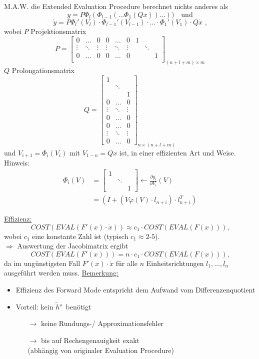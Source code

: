 \noindent M.A.W. die Extended Evaluation Procedure berechnet nichts anderes als
$$y=P \Phi_l(\Phi_{l-1}(\dots \Phi_1(Qx))\dots)) \quad \text{und}$$
$$\dot{y} = P \Phi_l'(V_l)\cdot\Phi_{l-1}'(V_{l-1})\cdot\dots\cdot\Phi_1'(V_1)\cdot Q\dot{x} \text{ ,}$$
wobei
$P$ Projektionsmatrix
$$ P =
\begin{bmatrix}
	  0		& \dots	& 0		& 0		& \dots	& 0		& 1	& 		&  \\
	  \vdots& \ddots& \vdots& \vdots& \ddots& \vdots& 	& \ddots&  \\
	  0		& \dots & 0		& 0		& \dots	& 0		&	&		& 1\\
\end{bmatrix}_{(n+l+m)\times m}
$$
$Q$ Prolongationsmatrix
$$ Q= 
\begin{bmatrix}
	1		&		&  \\
			& \ddots&  \\
			&		& 1\\
	0		& \dots	& 0\\
	\vdots	& \ddots& \vdots\\
	0		& \dots & 0\\
	
	0		& \dots	& 0\\
	\vdots	& \ddots& \vdots\\
	0		& \dots & 0	
\end{bmatrix}_{n \times (n+l+m)}
$$
und  $V_{i+1}=\Phi_i(V_i)$ mit $V_{1-n}=Qx$ ist,
in einer effizienten Art und Weise.\\

\noindent Hinweis:
\begin{align*}	
	\Phi_i(V) & = 
	\begin{bmatrix}
		1	&		&\\
			& \ddots&\\
			&		& 1
	\end{bmatrix}
	\leftarrow \frac{\partial y_i}{\partial V_i}(V)\\
	& = (I + (V\varphi(V)\cdot l_{n+i})\cdot l_{n+i}^T)
\end{align*}

\noindent
\underline{Effizienz:}
$$COST(EVAL(F'(x)\cdot \dot{x})) \approx c_1 \cdot COST(EVAL(F(x)))\text{,}$$
wobei $c_1$ eine konstante Zahl ist (typisch $c_1\approx 2\text{-}5$).\\
$\Rightarrow$ Auswertung der Jacobimatrix ergibt
$$COST(EVAL(F'(x))) = n \cdot c_1 \cdot COST(EVAL(F(x)))\text{,}$$
da im ungünstigsten Fall $F'(x)\cdot\dot{x}$ für alle $n$ Einheitsrichtungen $l_1,\dots, l_n$ ausgeführt werden muss.
\newpage
\noindent
\underline{Bemerkung:}
\begin{itemize}
	\item Effizienz des Forward Mode entspricht dem Aufwand vom Differenzenquotient
	\item Vorteil: kein \glqq $\tilde{h}$"\ benötigt
	\begin{itemize}
		\item[$\rightarrow$] keine Rundungs-/ Approximationsfehler
		\item[$\rightarrow$] bis auf Rechengenauigkeit exakt\\
		(abhängig von originaler Evaluation Procedure)
	\end{itemize}
\end{itemize}

